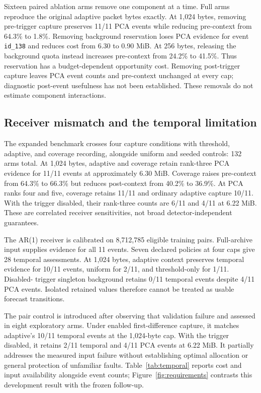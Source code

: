 Sixteen paired ablation arms remove one component at a time. Full arms reproduce
the original adaptive packet bytes exactly. At 1,024 bytes, removing pre-trigger
capture preserves 11/11 PCA events while reducing pre-context from 64.3\% to 1.8\%.
Removing background reservation loses PCA evidence for event \texttt{id\_138} and
reduces cost from 6.30 to 0.90 MiB. At 256 bytes, releasing the background quota
instead increases pre-context from 24.2\% to 41.5\%. Thus reservation has a
budget-dependent opportunity cost. Removing post-trigger capture leaves PCA event
counts and pre-context unchanged at every cap; diagnostic post-event usefulness
has not been established. These removals do not estimate component interactions.

\subsection{Receiver mismatch and the temporal limitation}
\label{sec:mismatch}
The expanded benchmark crosses four capture conditions with threshold, adaptive,
and coverage recording, alongside uniform and seeded controls: 132 arms total.
At 1,024 bytes, adaptive and coverage retain rank-three PCA evidence for 11/11
events at approximately 6.30 MiB. Coverage raises pre-context from 64.3\% to
66.3\% but reduces post-context from 40.2\% to 36.9\%. At PCA ranks four and
five, coverage retains 11/11 and ordinary adaptive capture 10/11. With the trigger
disabled, their rank-three counts are 6/11 and 4/11 at 6.22 MiB. These are
correlated receiver sensitivities, not broad detector-independent guarantees.

The AR(1) receiver is calibrated on 8,712,785 eligible training pairs. Full-archive
input supplies evidence for all 11 events. Seven declared policies at four caps
give 28 temporal assessments. At 1,024 bytes, adaptive context preserves temporal
evidence for 10/11 events, uniform for 2/11, and threshold-only for 1/11. Disabled-
trigger singleton background retains 0/11 temporal events despite 4/11 PCA events.
Isolated retained values therefore cannot be treated as usable forecast transitions.

The pair control is introduced after observing that validation failure and assessed
in eight exploratory arms. Under enabled first-difference capture, it matches
adaptive's 10/11 temporal events at the 1,024-byte cap. With the trigger disabled,
it retains 2/11 temporal and 4/11 PCA events at 6.22 MiB. It partially addresses
the measured input failure without establishing optimal allocation or general
protection of unfamiliar faults. Table~\ref{tab:temporal} reports cost and input
availability alongside event counts; Figure~\ref{fig:requirements} contrasts this
development result with the frozen follow-up.

\begin{table}[htbp]
\centering\small

\caption{Mission1 at 1,024 bytes per hour. Pairs require consecutive original
observations within the gap limit; input counts include periods excluded from
fault scoring. Burst rows are exploratory. Exact bytes and complete cap results
are in the reports.}
\label{tab:temporal}
\end{table}
